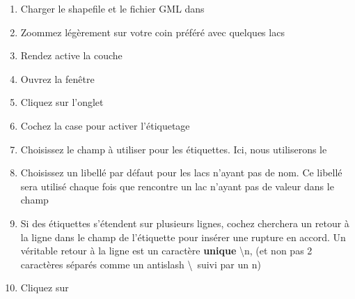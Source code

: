 \begin{enumerate}
\item Charger le shapefile  et le fichier GML  dans \qg
\item Zoommez légèrement sur votre coin préféré avec quelques lacs
\item Rendez active la couche 
\item Ouvrez la fenêtre 
\item Cliquez sur l'onglet 
\item Cochez la case  pour activer l'étiquetage
\item Choisissez le champ à utiliser pour les étiquettes. Ici, nous utiliserons le\\ 
\item Choisissez un libellé par défaut pour les lacs n'ayant pas de nom. Ce libellé sera utilisé chaque fois que \qg rencontre un lac n'ayant pas de valeur dans le champ 
\item Si des étiquettes s'étendent sur plusieurs lignes, cochez  \qg cherchera un retour à la ligne dans le champ de l'étiquette pour insérer une rupture en accord. Un véritable retour à la ligne est un caractère \textbf{unique} \textbackslash n, (et non pas 2 caractères séparés comme un antislash \textbackslash ~suivi par un n)
\item Cliquez sur 
\end{enumerate}

